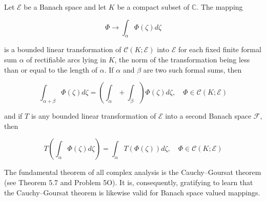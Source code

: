 Let $\mathcal{E}$ be a Banach space and let $K$ be a compact subset of $\mathbb{C}$. The mapping

$$\Phi \rightarrow \int_{\alpha} \Phi(\zeta) d\zeta$$

is a bounded linear transformation of $\mathcal{C}(K; \mathcal{E})$ into $\mathcal{E}$ for each fixed finite formal sum $\alpha$ of rectifiable arcs lying in $K$, the norm of the transformation being less than or equal to the length of $\alpha$. If $\alpha$ and $\beta$ are two such formal sums, then

$$\int_{\alpha + \beta} \Phi(\zeta) d\zeta = \left( \int_{\alpha} + \int_{\beta} \right) \Phi(\zeta) d\zeta, \quad \Phi \in \mathcal{C}(K; \mathcal{E})$$

and if $T$ is any bounded linear transformation of $\mathcal{E}$ into a second Banach space $\mathcal{F}$, then

$$T \left( \int_{\alpha} \Phi(\zeta) d\zeta \right) = \int_{\alpha} T(\Phi(\zeta)) d\zeta, \quad \Phi \in \mathcal{C}(K; \mathcal{E})$$

The fundamental theorem of all complex analysis is the Cauchy–Goursat theorem (see Theorem 5.7 and Problem 5O). It is, consequently, gratifying to learn that the Cauchy–Goursat theorem is likewise valid for Banach space valued mappings.

